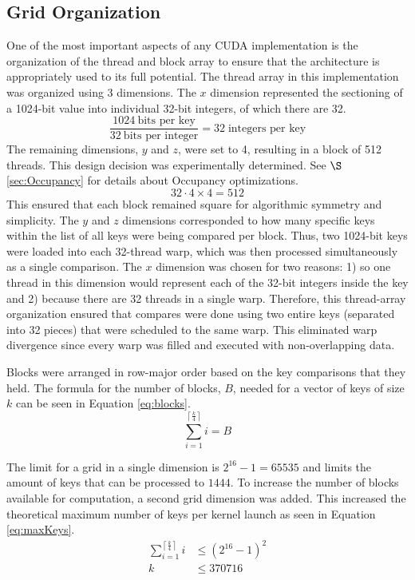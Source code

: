 \documentclass[10pt, conference]{./IEEEtran}
\begin{document}
\subsection{Grid Organization}
\label{sec:GridOrg}
One of the most important aspects of any CUDA implementation is the 
organization of the thread and block array to ensure that the architecture is 
appropriately used to its full potential. The thread array in this 
implementation was organized using 3 dimensions. The $x$ dimension represented 
the sectioning of a 1024-bit value into individual 32-bit integers, of which 
there are 32. 
\begin{displaymath}
   \frac{1024 \:\mbox{bits per key}}{32 \:\mbox{bits per integer}} = 
   32 \;\mbox{integers per key}
\end{displaymath}
The remaining dimensions, $y$ and $z$, were set to 4, resulting in a block of 
512 threads. This design decision was experimentally determined. See 
$\S$\ref{sec:Occupancy} for details about Occupancy optimizations.
\begin{displaymath}
   32 \cdot 4 \times 4 = 512
\end{displaymath}
This ensured that each block remained square for algorithmic 
symmetry and simplicity. The $y$ and $z$ dimensions corresponded to how many 
specific keys within the list of all keys were being compared per block. 
Thus, two 1024-bit keys were loaded into each 32-thread warp, which was 
then processed simultaneously as a single comparison. The $x$ dimension was 
chosen for two reasons: 1) so one thread in this dimension would represent 
each of the 32-bit integers inside the key and 2) because there are 32 threads 
in a single warp. Therefore, this thread-array organization ensured that 
compares were done using two entire keys (separated into 32 pieces) that were 
scheduled to the same warp. This eliminated warp divergence since every warp 
was filled and executed with non-overlapping data.

Blocks were arranged in row-major order based on the key comparisons that they 
held. The formula for the number of blocks, $B$, needed for a vector of keys of 
size $k$ can be seen in Equation \ref{eq:blocks}.
\begin{equation}
   \sum_{i=1}^{\left\lceil \frac{k}{4} \right\rceil}i = B
   \label{eq:blocks}
\end{equation}

The limit for a grid in a single dimension is $2^{16} - 1 = 65535$ 
and limits the amount of keys that can be processed to $1444$. To increase 
the number of blocks available for computation, a second grid dimension was 
added. This increased the theoretical maximum number of keys per kernel 
launch as seen in Equation \ref{eq:maxKeys}.
\begin{equation}
   \begin{split}
   \sum_{i = 1}^{\left\lceil\frac{k}{4}\right\rceil} i & \leq {\left(2^{16} - 
   1\right)}^2\\
   k & \leq 370716\\
   \end{split}
   \label{eq:maxKeys}
\end{equation}
\end{document}

